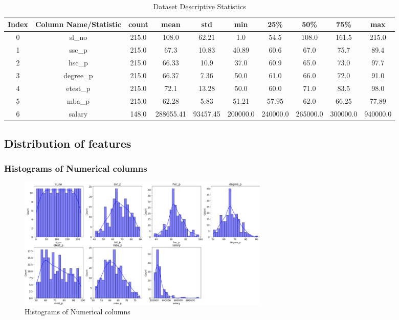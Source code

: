 \documentclass{article}%
\begin{document}
\begin{table}[h!]%
\caption{Dataset Descriptive Statistics}%
\vspace{0.2cm}%
\centering%
\begin{tabular}{|c||c||c||c||c||c||c||c||c||c|}%
\hline%
Index&Column Name/Statistic&count&mean&std&min&25\%&50\%&75\%&max\\%
\hline%
0&sl\_no&215.0&108.0&62.21&1.0&54.5&108.0&161.5&215.0\\%
1&ssc\_p&215.0&67.3&10.83&40.89&60.6&67.0&75.7&89.4\\%
2&hsc\_p&215.0&66.33&10.9&37.0&60.9&65.0&73.0&97.7\\%
3&degree\_p&215.0&66.37&7.36&50.0&61.0&66.0&72.0&91.0\\%
4&etest\_p&215.0&72.1&13.28&50.0&60.0&71.0&83.5&98.0\\%
5&mba\_p&215.0&62.28&5.83&51.21&57.95&62.0&66.25&77.89\\%
6&salary&148.0&288655.41&93457.45&200000.0&240000.0&265000.0&300000.0&940000.0\\%
\hline%
\end{tabular}%
\end{table}

%
\newpage%
\subsection{Distribution of features}%
\label{subsec:Distributionoffeatures}%
\subsubsection{Histograms of Numerical columns}%
\label{ssubsec:HistogramsofNumericalcolumns}%


\begin{figure}[h!]%
\centering%
\includegraphics[width=460px]{EDA/histograms.png}%
\caption{Histograms of Numerical columns}%
\end{figure}
\end{document}
